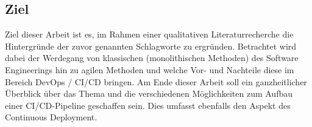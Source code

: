 \subsection{Ziel}
\label{Ziel}
Ziel dieser Arbeit ist es, im Rahmen einer qualitativen Literaturrecherche die Hintergründe der
zuvor genannten Schlagworte zu ergründen. Betrachtet wird dabei der Werdegang von klassischen
(monolithischen Methoden) des Software Engineerings hin zu agilen Methoden und welche
Vor- und Nachteile diese im Bereich DevOps / CI/CD bringen.
Am Ende dieser Arbeit soll ein ganzheitlicher Überblick über das Thema und die verschiedenen Möglichkeiten zum Aufbau einer \acrshort{CI}/\acrshort{CD}-Pipeline geschaffen sein.  Dies umfasst ebenfalls den Aspekt des Continuous Deployment.
